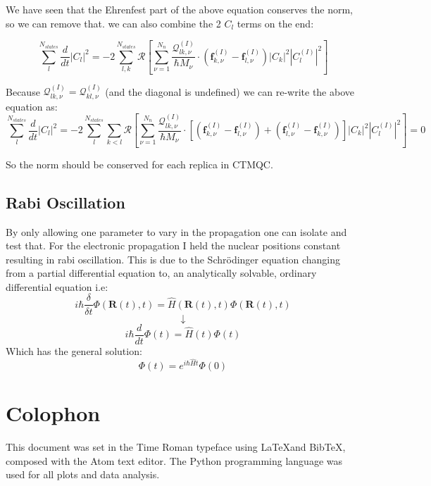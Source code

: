 We have seen that the Ehrenfest part of the above equation conserves the norm, so we can remove that. we can also combine the 2 $C_l$ terms on the end:

\[ \sum_{l}^{N_{states}} \frac{d}{dt} \vert C_{l} \vert^2 = -2 \sum_{l,k}^{N_{states}} \mathcal{R}\left[ \sum_{\nu=1}^{N_n}\frac{\mathcal{Q}_{lk,\nu}^{(I)}}{\hbar M_{\nu}}\cdot \left(\textbf{f}_{k,\nu}^{(I)} - \textbf{f}_{l,\nu}^{(I)}\right)|C_k|^2 |C_l^{(I)}|^2 \right] \]

Because $\mathcal{Q}_{lk,\nu}^{(I)} = \mathcal{Q}_{kl,\nu}^{(I)}$ (and the diagonal is undefined) we can re-write the above equation as:
\[ \sum_{l}^{N_{states}} \frac{d}{dt} \vert C_{l} \vert^2 = -2 \sum_{l}^{N_{states}} \sum_{k<l} \mathcal{R}\left[ \sum_{\nu=1}^{N_n}\frac{\mathcal{Q}_{lk,\nu}^{(I)}}{\hbar M_{\nu}}\cdot \left[ \left(\textbf{f}_{k,\nu}^{(I)} - \textbf{f}_{l,\nu}^{(I)}\right) + \left(\textbf{f}_{l,\nu}^{(I)} - \textbf{f}_{k,\nu}^{(I)}\right)\right]|C_k|^2 |C_l^{(I)}|^2 \right] = 0 \]

So the norm should be conserved for each replica in CTMQC.

\section{Rabi Oscillation \label{ap:Rabi}}
By only allowing one parameter to vary in the propagation one can isolate and test that. For the electronic propagation I held the nuclear positions constant resulting in rabi oscillation. This is due  to the Schr\"odinger equation changing from a partial differential equation to, an analytically solvable, ordinary differential equation  i.e:
\[i \hbar \frac{\delta}{\delta t} \Phi(\textbf{R}(t), t) = \hat{H}(\textbf{R}(t), t) \Phi(\textbf{R}(t), t)\]
\[\downarrow\]
\[i \hbar \frac{d}{d t} \Phi(t) = \hat{H}(t) \Phi( t)\]
Which has the general solution:
\[\Phi(t) = e^{i \hbar \hat{H}t} \Phi(0)\]




\chapter{Colophon}
\label{appendixlabel3}
This document was set in the Time Roman typeface using \LaTeX and Bib\TeX, composed with the Atom text editor. The Python programming language was used for all plots and data analysis.
